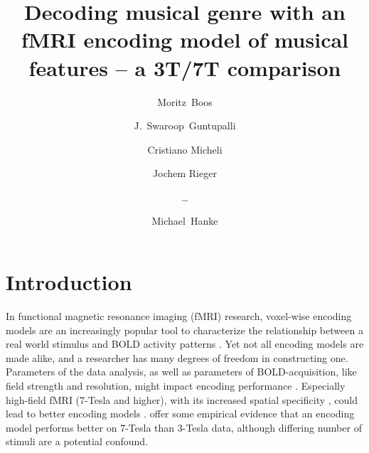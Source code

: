 



\title{Decoding musical genre with an fMRI encoding model of musical
features -- a 3T/7T comparison}


\author[1]{Moritz~Boos}
\author[2]{J.~Swaroop~Guntupalli}
\author[1]{Cristiano Micheli}
\author[1]{Jochem Rieger}
\author[0]{\ldots}
\author[3,4]{Michael~Hanke}

\maketitle
\thispagestyle{fancy}

\listoftodos

\begin{abstract}

\end{abstract}

\clearpage


\section*{Introduction}

In functional magnetic resonance imaging (f{MRI}) research, voxel-wise encoding
models are an increasingly popular tool to characterize the relationship
between a real world stimulus and BOLD activity patterns
\citep{NG11,TD+06,KG+08,SZ09}.  Yet not all encoding models are made alike, and
a researcher has many degrees of freedom in constructing one.  Parameters of
the data analysis, as well as parameters of BOLD-acquisition, like field
strength and resolution, might impact encoding performance \citep{KB07,FK12}.
Especially high-field f{MRI} (7-Tesla and higher), with its increased spatial
specificity \citep{THW+05,YU08}, could lead to better encoding models \citep{FK12}. 
\citet{SF14} offer some empirical evidence that an encoding model performs better on
7-Tesla than 3-Tesla data, although differing number of stimuli are a potential
confound. 

